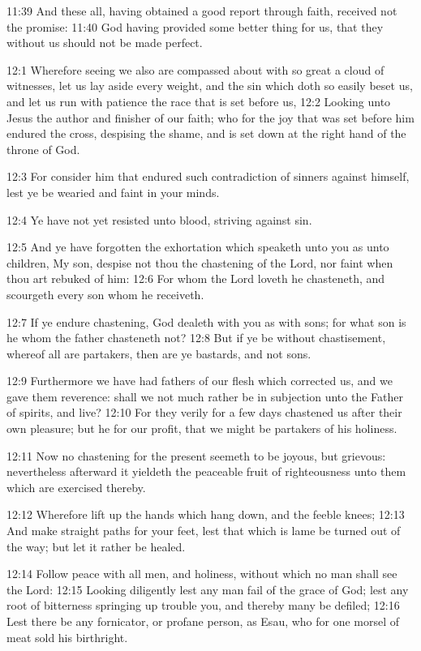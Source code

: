 11:39 And these all, having obtained a good report through faith,
received not the promise: 11:40 God having provided some better thing
for us, that they without us should not be made perfect.

12:1 Wherefore seeing we also are compassed about with so great a
cloud of witnesses, let us lay aside every weight, and the sin which
doth so easily beset us, and let us run with patience the race that is
set before us, 12:2 Looking unto Jesus the author and finisher of our
faith; who for the joy that was set before him endured the cross,
despising the shame, and is set down at the right hand of the throne
of God.

12:3 For consider him that endured such contradiction of sinners
against himself, lest ye be wearied and faint in your minds.

12:4 Ye have not yet resisted unto blood, striving against sin.

12:5 And ye have forgotten the exhortation which speaketh unto you as
unto children, My son, despise not thou the chastening of the Lord,
nor faint when thou art rebuked of him: 12:6 For whom the Lord loveth
he chasteneth, and scourgeth every son whom he receiveth.

12:7 If ye endure chastening, God dealeth with you as with sons; for
what son is he whom the father chasteneth not?  12:8 But if ye be
without chastisement, whereof all are partakers, then are ye bastards,
and not sons.

12:9 Furthermore we have had fathers of our flesh which corrected us,
and we gave them reverence: shall we not much rather be in subjection
unto the Father of spirits, and live?  12:10 For they verily for a few
days chastened us after their own pleasure; but he for our profit,
that we might be partakers of his holiness.

12:11 Now no chastening for the present seemeth to be joyous, but
grievous: nevertheless afterward it yieldeth the peaceable fruit of
righteousness unto them which are exercised thereby.

12:12 Wherefore lift up the hands which hang down, and the feeble
knees; 12:13 And make straight paths for your feet, lest that which is
lame be turned out of the way; but let it rather be healed.

12:14 Follow peace with all men, and holiness, without which no man
shall see the Lord: 12:15 Looking diligently lest any man fail of the
grace of God; lest any root of bitterness springing up trouble you,
and thereby many be defiled; 12:16 Lest there be any fornicator, or
profane person, as Esau, who for one morsel of meat sold his
birthright.

